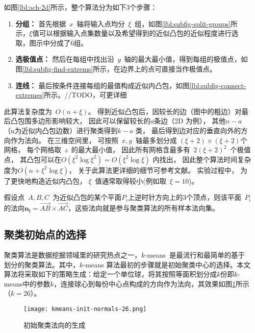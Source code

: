 如图\ref{lbl:ach-2d}所示，整个算法分为如下3个步骤：
\begin{enumerate}[(1)]
\item \textbf{分组：}
首先根据~$x$~轴将输入点均分~$\xi$~组，如图\ref{lbl:subfig-split-groups}所示，$\xi$值可以根据输入点集数量以及希望得到的近似凸包的近似程度进行选取，图示中分成了6组。
\item \textbf{选极值点：}
然后在每组中找出沿~$y$~轴的最大最小值，得到每组的极值点，如图\ref{lbl:subfig-find-extrems}所示，在边界上的点可直接当作极值点。
\item \textbf{连线：}
最后按条件连接每组的最值构成近似内凸包，如图\ref{lbl:subfig-connect-extremes}所示。//TODO，可更详细
\end{enumerate}
此算法复杂度为~$O(n+\xi)$。  
得到近似凸包后，因较长的边（图中的粗边）对最后凸包围多边形影响较大， 因此可以保留较长的$a$条边（2D 为例）， 其他$n-a$（n为近似内凸包边数）进行聚类得到$k-a$ 类， 最后得到边对应的垂直向外的方向作为法向。
在三维空间里， 可按照~$x,y$~轴最多划分成 $(\xi+2)\times (\xi+2)$个网格， 每个网格取~$z$~的最大最小值， 因此所有网格含最多有~$2(\xi+2)^2$~个极值点， 其凸包可以在$O(\xi^2\log \xi^2) = O(\xi^2\log \xi)$ 内找出， 因此整个算法时间复杂度为$O(n+\xi^2\log\xi)$， 
关于此算法更详细的细节可参考文献。 实验过程中， 为了更快地构造近似内凸包， $\xi$~值通常取得较小(例如取~$\xi=10$)。

假设点~$A,B,C$~为近似凸包的某个平面$P_i$上逆时针方向上的3个顶点，则该平面~$P_i$的法向$\bm{n_i}
= \overrightarrow{AB} \times
\overrightarrow{AC}$，这些法向就是参与聚类算法的所有样本法向集。


\subsection{聚类初始点的选择}
\label{subsec:initial-normals}

聚类算法是数据挖掘领域里的研究热点之一，$k$-means~是最流行和最简单的基于划分的聚类算法\cite{Jain2010}。其中，$k$-means
算法最初的步骤就是初始聚类中心的选择。本文算法将采取如下的策略生成：给定一个单位球，将其按照等面积划分成$k$份即$k$-means中的参数$k$，连接球心到每份中心点构成的方向作为法向，其效果如图\ref{lbl:kmeans-init-normals-26}所示（$k=26$）。

\begin{figure}[htbp]
    \centering
    \texttt{[image: kmeans-init-normals-26.png]}
    \caption{初始聚类法向的生成}
    \label{lbl:kmeans-init-normals-26}
\end{figure}

